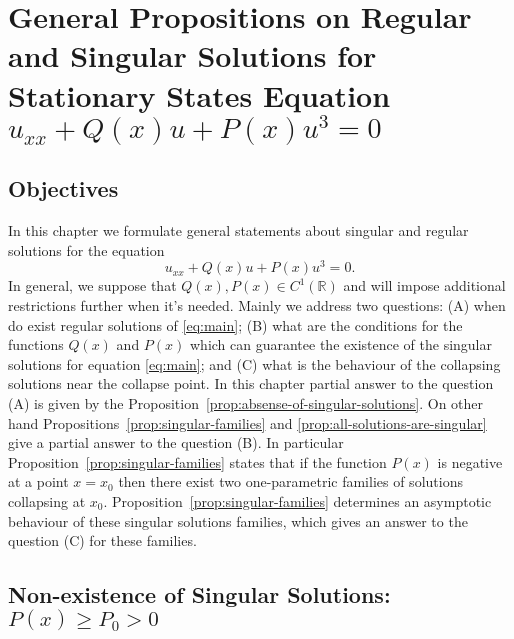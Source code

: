 \chapter{General Propositions on Regular and Singular Solutions for Stationary States Equation $u_{xx} + Q(x) u + P(x) u^3 = 0$}
\label{chapter:I}

\section{Objectives}

In this chapter we formulate general statements about singular and regular solutions for the equation
\begin{equation}
	u_{xx} + Q(x) u + P(x) u^3 = 0.
	\label{eq:main}
\end{equation}
In general, we suppose that $Q(x), P(x) \in C^1(\mathbb{R})$ and will impose additional restrictions further when it's needed.
Mainly we address two questions: (A) when do exist regular solutions of \eqref{eq:main}; (B) what are the conditions for the functions $Q(x)$ and $P(x)$ which can guarantee the existence of the singular solutions for equation \eqref{eq:main}; and (C) what is the behaviour of the collapsing solutions near the collapse point.
In this chapter partial answer to the question (A) is given by the Proposition~\ref{prop:absense-of-singular-solutions}.
On other hand Propositions~\ref{prop:singular-families} and \ref{prop:all-solutions-are-singular} give a partial answer to the question (B).
In particular Proposition~\ref{prop:singular-families} states that if the function $P(x)$ is negative at a point $x = x_0$ then there exist two one-parametric families of solutions collapsing at $x_0$.
Proposition~\ref{prop:singular-families} determines an asymptotic behaviour of these singular solutions families, which gives an answer to the question (C) for these families.

\section{Non-existence of Singular Solutions: $P(x) \ge P_0 > 0$}

